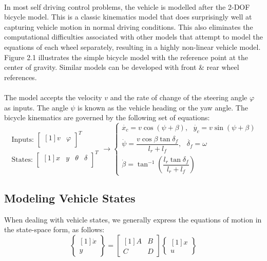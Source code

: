 \paragraph{}
In most self driving control problems, the vehicle is modelled after the 2-DOF bicycle model. This is a classic kinematics model that does surprisingly well at capturing vehicle motion in normal driving conditions. This also eliminates the computational difficulties associated with other models that attempt to model the equations of each wheel separately, resulting in a highly non-linear vehicle model. Figure 2.1 illustrates the simple bicycle model with the reference point at the center of gravity. Similar models can be developed with front \& rear wheel references.

\paragraph{}
The model accepts the velocity $v$ and the rate of change of the steering angle $\varphi$ as inputs. The angle $\psi$ is known as the vehicle heading or the yaw angle. The bicycle kinematics are governed by the following set of equations:
$$\begin{array}{r}
    \text{Inputs: }\begin{bmatrix}[1] v & \varphi\\ \end{bmatrix}^T\\
    \text{States: }\begin{bmatrix}[1] x & y & \theta & \delta\\ \end{bmatrix}^T
\end{array}\longrightarrow\left\lbrace\begin{array}{l}
    \dot{x_c} = v\cos(\psi + \beta),\text{ } \dot{y_c} = v\sin(\psi + \beta)\\
    \dot{\psi} = \dfrac{v\cos\beta\tan\delta_f}{l_r+l_f},\text{ } \dot{\delta_f} = \omega\\
    \dot{\beta} = \tan^{-1}\left(\dfrac{l_r\tan\delta_f}{l_r + l_f}\right)
\end{array}\right.$$

\subsection{Modeling Vehicle States}
When dealing with vehicle states, we generally express the equations of motion in the state-space form, as follows:
$$\begin{Bmatrix}[1] \dot{x}\\ y \end{Bmatrix} = \begin{bmatrix}[1] A & B\\ C & D \end{bmatrix}\begin{Bmatrix}[1] x\\ u \end{Bmatrix}$$

